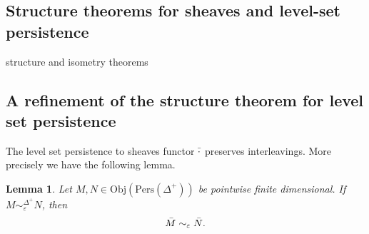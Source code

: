 \documentclass[a4paper, english, 11pt]{article}
\newcommand{\Pe}{\text{Pers}}
\newcommand{\0}{\vec{0}}
\newcommand{\Obj}[0]{\text{Obj}}
\newtheorem{lem}[prop]{Lemma}
\begin{document}
\subsection{Structure theorems for sheaves and level-set persistence}

structure and isometry theorems

\subsection{A refinement of the structure theorem for level set persistence}


The level set persistence to sheaves functor $\Bar{\cdot}$ preserves interleavings. More precisely we have the following lemma.
\begin{lem}\label{L:Barpreserveentre} Let $M, N\in \Obj(\Pe(\Delta^+))$ be pointwise finite dimensional. If $M \sim_\varepsilon^{\Delta^+} N$, then 
 $$ \Bar{M} \sim_\varepsilon \Bar{N}.$$
\end{lem}
\end{document}
